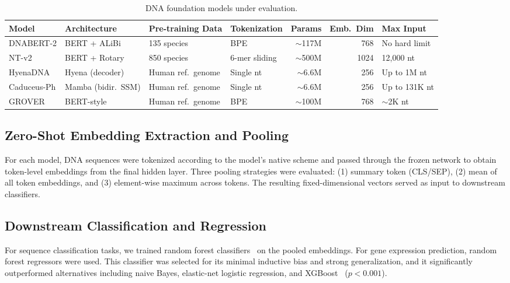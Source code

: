 \documentclass[11pt]{article}
\begin{document}
\begin{table}[ht]
\centering
\caption{DNA foundation models under evaluation.}
\label{tab:models}
\begin{adjustbox}{max width=\textwidth}
\begin{tabular}{@{}llllrrl@{}}
\toprule
Model & Architecture & Pre-training Data & Tokenization & Params & Emb.\ Dim & Max Input \\
\midrule
DNABERT-2 & BERT + ALiBi & 135 species & BPE & $\sim$117M & 768 & No hard limit \\
NT-v2 & BERT + Rotary & 850 species & 6-mer sliding & $\sim$500M & 1024 & 12,000 nt \\
HyenaDNA & Hyena (decoder) & Human ref.\ genome & Single nt & $\sim$6.6M & 256 & Up to 1M nt \\
Caduceus-Ph & Mamba (bidir.\ SSM) & Human ref.\ genome & Single nt & $\sim$6.6M & 256 & Up to 131K nt \\
GROVER & BERT-style & Human ref.\ genome & BPE & $\sim$100M & 768 & $\sim$2K nt \\
\bottomrule
\end{tabular}
\end{adjustbox}
\end{table}

\subsection{Zero-Shot Embedding Extraction and Pooling}

For each model, DNA sequences were tokenized according to the model's native scheme and passed through the frozen network to obtain token-level embeddings from the final hidden layer.  Three pooling strategies were evaluated: (1) summary token (CLS/SEP), (2) mean of all token embeddings, and (3) element-wise maximum across tokens.  The resulting fixed-dimensional vectors served as input to downstream classifiers.

\subsection{Downstream Classification and Regression}

For sequence classification tasks, we trained random forest classifiers~\citep{breiman2001random} on the pooled embeddings.  For gene expression prediction, random forest regressors were used.  This classifier was selected for its minimal inductive bias and strong generalization, and it significantly outperformed alternatives including naive Bayes, elastic-net logistic regression, and XGBoost~\citep{chen2016xgboost} ($p < 0.001$).
\end{document}
